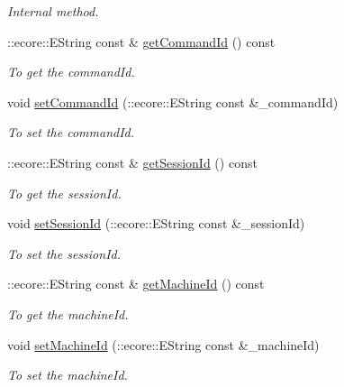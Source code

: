 \begin{DoxyCompactItemize}
\begin{DoxyCompactList}\small\item\em Internal method. \item\end{DoxyCompactList}\item 
::ecore::EString const \& \hyperlink{classUMS__Data_1_1Command_a02cc991754298f0f1a1083a37015bf09}{getCommandId} () const 
\begin{DoxyCompactList}\small\item\em To get the commandId. \item\end{DoxyCompactList}\item 
void \hyperlink{classUMS__Data_1_1Command_ab0a4cf005a5cd3b178337c7bb52c40fe}{setCommandId} (::ecore::EString const \&\_\-commandId)
\begin{DoxyCompactList}\small\item\em To set the commandId. \item\end{DoxyCompactList}\item 
::ecore::EString const \& \hyperlink{classUMS__Data_1_1Command_a08c28237fabe97ca3778e87cffb0df0d}{getSessionId} () const 
\begin{DoxyCompactList}\small\item\em To get the sessionId. \item\end{DoxyCompactList}\item 
void \hyperlink{classUMS__Data_1_1Command_a6c2c7439b45124dbec48cec8b784ed93}{setSessionId} (::ecore::EString const \&\_\-sessionId)
\begin{DoxyCompactList}\small\item\em To set the sessionId. \item\end{DoxyCompactList}\item 
::ecore::EString const \& \hyperlink{classUMS__Data_1_1Command_a699dddb34ea4dc4ba4be8fdd340aa931}{getMachineId} () const 
\begin{DoxyCompactList}\small\item\em To get the machineId. \item\end{DoxyCompactList}\item 
void \hyperlink{classUMS__Data_1_1Command_a327abd7fe78bf355073ffd5191e7f64e}{setMachineId} (::ecore::EString const \&\_\-machineId)
\begin{DoxyCompactList}\small\item\em To set the machineId. \item\end{DoxyCompactList}\item 

\end{DoxyCompactItemize}
